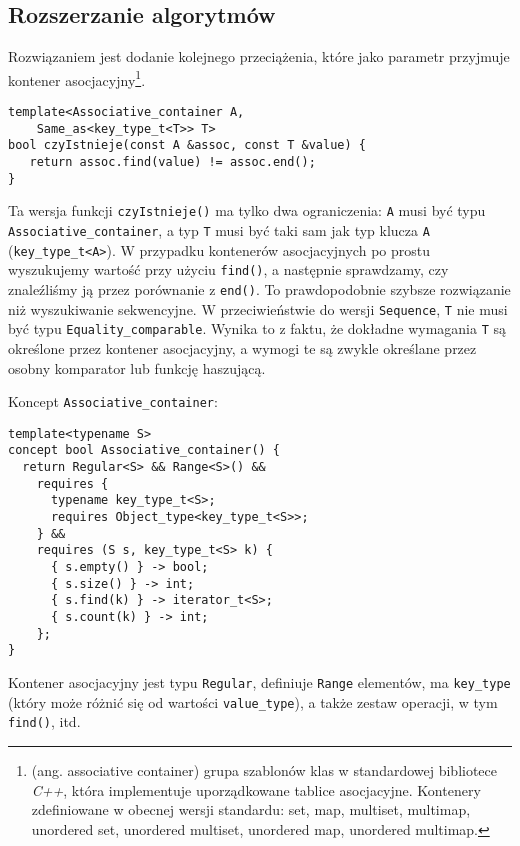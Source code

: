 \documentclass[11pt, a4paper]{article}
\begin{document}
\lstset{language=C++}

\subsection{Rozszerzanie algorytmów}

Rozwiązaniem jest dodanie kolejnego przeciążenia, które jako parametr przyjmuje kontener asocjacyjny\footnote{(ang. associative container) grupa szablonów klas w standardowej bibliotece \emph{C++}, która implementuje uporządkowane tablice asocjacyjne. Kontenery zdefiniowane w obecnej wersji standardu: set, map, multiset, multimap, unordered set, unordered multiset, unordered map, unordered multimap.}.\newline
\begin{lstlisting}[frame=single]
template<Associative_container A,
    Same_as<key_type_t<T>> T>
bool czyIstnieje(const A &assoc, const T &value) {
   return assoc.find(value) != assoc.end();
}
\end{lstlisting}

Ta wersja funkcji \verb#czyIstnieje()# ma tylko dwa ograniczenia: \verb#A# musi być typu \verb#Associative_container#, a typ \verb#T# musi być taki sam jak typ klucza \verb#A# (\verb#key_type_t<A>#). W przypadku kontenerów asocjacyjnych po prostu wyszukujemy wartość przy użyciu \verb#find()#, a następnie sprawdzamy, czy znaleźliśmy ją przez porównanie z \verb#end()#. To prawdopodobnie szybsze rozwiązanie niż wyszukiwanie sekwencyjne. W przeciwieństwie do wersji \verb#Sequence#, \verb#T# nie musi być typu \verb#Equality_comparable#. Wynika to z faktu, że dokładne wymagania \verb#T# są określone przez kontener asocjacyjny, a wymogi te są zwykle określane przez osobny komparator lub funkcję haszującą. \newline

\noindent Koncept \verb#Associative_container#:

\begin{lstlisting}[frame=single]
template<typename S>
concept bool Associative_container() {
  return Regular<S> && Range<S>() && 
    requires {
      typename key_type_t<S>;
      requires Object_type<key_type_t<S>>;
    } &&
    requires (S s, key_type_t<S> k) {
      { s.empty() } -> bool;
      { s.size() } -> int;
      { s.find(k) } -> iterator_t<S>;
      { s.count(k) } -> int;
    };
}
\end{lstlisting}

\noindent Kontener asocjacyjny jest typu \verb#Regular#, definiuje \verb#Range# elementów, ma \verb#key_type# (który może różnić się od wartości \verb#value_type#), a także zestaw operacji, w tym \verb#find()#, itd.
\end{document}
